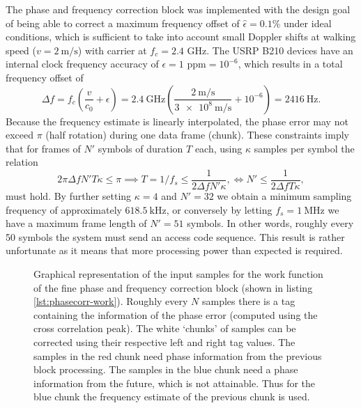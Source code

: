 The phase and frequency correction block was implemented with the design goal of being able to correct a maximum frequency offset of \(\hat{\epsilon} = 0.1\%\) under ideal conditions, which is sufficient to take into account small Doppler shifts at walking speed (\(v = \SI{2}{\meter\per\second}\)) with carrier at \(f_c = 2.4\) GHz. The USRP B210 devices have an internal clock frequency accuracy of \(\epsilon = 1\text{ ppm} = 10^{-6}\), which results in a total frequency offset of
\begin{equation}\label{eq:doppler}
	\Delta f = f_c \left( \frac{v}{c_0} + \epsilon \right)
	= \SI{2.4}{\giga\hertz} \left(
		\frac{\SI{2}{\meter\per\second}}{\SI{3e8}{\meter\per\second}} + 10^{-6} 
	\right) = \SI{2416}{\hertz}.
\end{equation}
Because the frequency estimate is linearly interpolated, the phase error may not exceed \(\pi\) (half rotation) during one data frame (chunk). These constraints imply that for frames of \(N'\) symbols of duration \(T\) each, using \(\kappa\) samples per symbol the relation
\begin{equation}\label{Doppler-shift}
	2\pi\Delta f N' T \kappa \leq \pi
	\implies T = 1/f_s \leq \frac{1}{2\Delta f N' \kappa},
	\iff N' \leq \frac{1}{2\Delta f T \kappa},
\end{equation}
must hold. By further setting \(\kappa = 4\) and \(N' = 32\) we obtain a minimum sampling frequency of approximately \(\SI{618.5}{\kilo\hertz}\), or conversely by letting \(f_s = \SI{1}{\mega\hertz}\) we have a maximum frame length of \(N' = 51\) symbols. In other words, roughly every 50 symbols the system must send an access code sequence. This result is rather unfortunate as it means that more processing power than expected is required.

\begin{figure}
	\centering
	
	\caption{
		Graphical representation of the input samples for the work function of the fine phase and frequency correction block (shown in listing \ref{lst:phasecorr-work}). Roughly every \(N\) samples there is a tag containing the information of the phase error (computed using the cross correlation peak). The white `chunks' of samples can be corrected using their respective left and right tag values. The samples in the red chunk need phase information from the previous block processing. The samples in the blue chunk need a phase information from the future, which is not attainable. Thus for the blue chunk the frequency estimate of the previous chunk is used.
		\label{fig:phasecorr-chunks}
	}
\end{figure}


